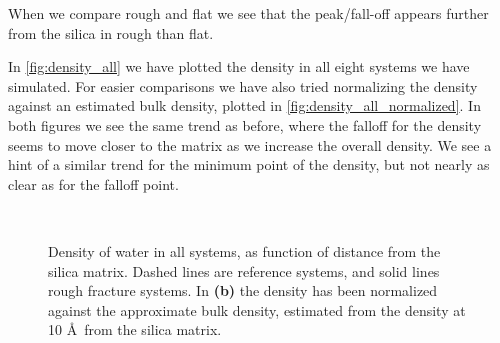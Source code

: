 
When we compare rough and flat we see that the peak/fall-off appears further from the silica in rough than flat.

In \cref{fig:density_all} we have plotted the density in all eight systems we have simulated. For easier comparisons we have also tried normalizing the density against an estimated bulk density, plotted in \cref{fig:density_all_normalized}. In both figures we see the same trend as before, where the falloff for the density seems to move closer to the matrix as we increase the overall density. We see a hint of a similar trend for the minimum point of the density, but not nearly as clear as for the falloff point.

%
\begin{figure}[!p]%
    \centering%
    \setlength{\myfigwidth}{0.88\textwidth}%
    \setlength{\mycaptionwidth}{0.09999\textwidth}%
    \begin{minipage}[c]{\myfigwidth}%
    \end{minipage}%
    \begin{minipage}[c]{\mycaptionwidth}%
        \subcaption{\label{fig:density_all}}%
    \end{minipage}%
    \\%
    \begin{minipage}[c]{\myfigwidth}%
    \end{minipage}%
    \begin{minipage}[c]{\mycaptionwidth}%
        \subcaption{\label{fig:density_all_normalized}}%
    \end{minipage}%
    \captionsetup{width=\textwidth}%
    \caption{%
        Density of water in all systems, as function of distance from the silica matrix. Dashed lines are reference systems, and solid lines rough fracture systems. In \textbf{(b)} the density has been normalized against the approximate bulk density, estimated from the density at 10 \AA\ from the silica matrix. %
        \label{fig:last_density_fig}%
    }%
\end{figure}%